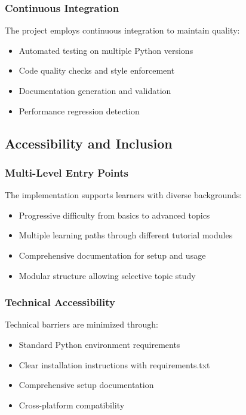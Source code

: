 \subsubsection{Continuous Integration}

The project employs continuous integration to maintain quality:

\begin{itemize}
    \item Automated testing on multiple Python versions
    \item Code quality checks and style enforcement
    \item Documentation generation and validation
    \item Performance regression detection
\end{itemize}

\subsection{Accessibility and Inclusion}

\subsubsection{Multi-Level Entry Points}

The implementation supports learners with diverse backgrounds:

\begin{itemize}
    \item Progressive difficulty from basics to advanced topics
    \item Multiple learning paths through different tutorial modules
    \item Comprehensive documentation for setup and usage
    \item Modular structure allowing selective topic study
\end{itemize}

\subsubsection{Technical Accessibility}

Technical barriers are minimized through:

\begin{itemize}
    \item Standard Python environment requirements
    \item Clear installation instructions with requirements.txt
    \item Comprehensive setup documentation
    \item Cross-platform compatibility
\end{itemize}


